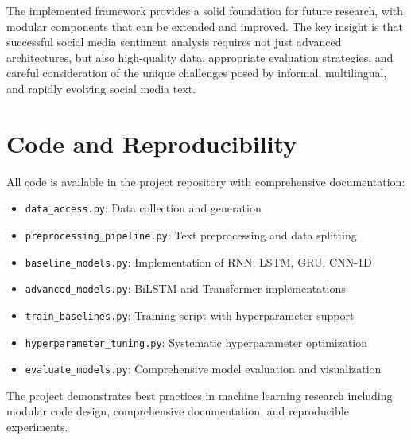 \documentclass[11pt,a4paper]{article}
\begin{document}
The implemented framework provides a solid foundation for future research, with modular components that can be extended and improved. The key insight is that successful social media sentiment analysis requires not just advanced architectures, but also high-quality data, appropriate evaluation strategies, and careful consideration of the unique challenges posed by informal, multilingual, and rapidly evolving social media text.

\section{Code and Reproducibility}

All code is available in the project repository with comprehensive documentation:

\begin{itemize}
    \item \texttt{data\_access.py}: Data collection and generation
    \item \texttt{preprocessing\_pipeline.py}: Text preprocessing and data splitting
    \item \texttt{baseline\_models.py}: Implementation of RNN, LSTM, GRU, CNN-1D
    \item \texttt{advanced\_models.py}: BiLSTM and Transformer implementations
    \item \texttt{train\_baselines.py}: Training script with hyperparameter support
    \item \texttt{hyperparameter\_tuning.py}: Systematic hyperparameter optimization
    \item \texttt{evaluate\_models.py}: Comprehensive model evaluation and visualization
\end{itemize}

The project demonstrates best practices in machine learning research including modular code design, comprehensive documentation, and reproducible experiments.
\end{document}
